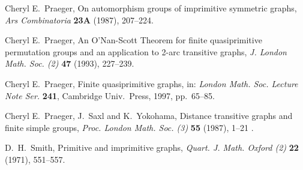 \documentclass[12pt, a4paper]{article}
\begin{document}
\begin{thebibliography}{99}
 
Cheryl E.~Praeger, On automorphism groups of imprimitive symmetric graphs, 
\emph{Ars Combinatoria}
\textbf{23A} (1987), 207--224.

Cheryl E.~Praeger, An O'Nan-Scott Theorem for finite quasiprimitive
permutation groups and an application to 2-arc transitive graphs, 
{\it J. London Math. Soc. (2)} {\bf 47} (1993), 227--239. 

Cheryl E.~Praeger, Finite quasiprimitive graphs, 
in: {\it London Math. Soc. Lecture Note Ser.} {\bf 241}, 
Cambridge Univ.~Press, 1997, pp.~65--85.

Cheryl E.~Praeger, J.~Saxl and K.~Yokohama, Distance transitive graphs and
finite simple groups, {\it Proc. London Math. Soc. (3)} {\bf 55} (1987), 
1--21 .


D.~H.~Smith, Primitive and imprimitive graphs, 
{\it Quart. J. Math. Oxford (2)} {\bf 22} (1971), 551--557.



\end{thebibliography}
\end{document}
